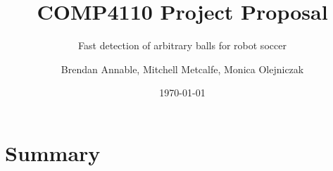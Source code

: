 \documentclass[11pt]{scrartcl} %
\title{COMP4110 Project Proposal}
\subtitle{Fast detection of arbitrary balls for robot soccer}
\author{ Brendan Annable, Mitchell Metcalfe, Monica Olejniczak }
\date{\today}
\begin{document}
	\maketitle

	\begin{abstract}
		
		
	\end{abstract}

	\newpage
	\tableofcontents
	\newpage


	\section{Summary} {

		
	}
\end{document}
